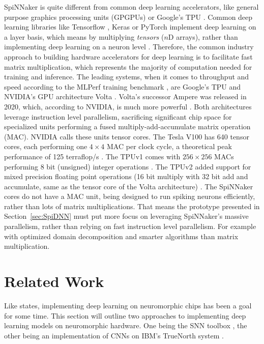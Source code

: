 \documentclass[]{article}
\begin{document}
SpiNNaker is quite different from common deep learning accelerators,
like general purpose graphics processing units (GPGPUs) or Google's
TPU \citep{jouppi_et_al_2017}.
Common deep learning libraries like Tensorflow
\citep{abadi_et_al_2015}, Keras \citep{keras} or PyTorch
\citep{paszke_et_al_2019} implement
deep learning on a layer basis, which means by multiplying
\textit{tensors} ($n$D arrays), rather than implementing deep learning
on a neuron level \citep{goodfellow_et_al_2016}.
Therefore, the common industry approach to building hardware
accelerators for deep learning is to facilitate fast matrix
multiplication, which represents the majority of computation needed
for training and inference.
The leading systems, when it comes to throughput and speed according
to the MLPerf training benchmark \citep{mlperf_2019}, are Google's
TPU \citep{jouppi_et_al_2017} and NVIDIA's GPU architecture
Volta \citep{durant_et_al_2017}.
Volta's successor Ampere was released in 2020, which, according to
NVIDIA, is much more powerful \citep{krashinsky_et_al_2020}.
Both architectures leverage instruction level parallelism, sacrificing
significant chip space for specialized units performing a
fused multiply-add-accumulate matrix operation (MAC).
NVIDIA calls these units tensor cores. The Tesla V100 has 640 tensor
cores, each performing one $4\times 4$ MAC per clock cycle, a
theoretical peak performance of 125 terraflop/s
\citep{markidis_et_al_2018}.
The TPUv1 comes with $256\times256$ MACs performing 8 bit (unsigned)
integer operations \citep{jouppi_et_al_2017}.
The TPUv2 added support for mixed precision floating point operations
(16 bit multiply with 32 bit add and accumulate, same as the
tensor core of the Volta architecture)
\citep{kennedy_2017, markidis_et_al_2018}.
The SpiNNaker cores do not have a MAC unit, being designed to run
spiking neurons efficiently, rather than lots of matrix
multiplications.
That means the prototype presented in Section~\ref{sec:SpiDNN} must
put more focus on leveraging SpiNNaker's massive parallelism, rather
than relying on fast instruction level parallelism.
For example with optimized domain decomposition and smarter algorithms
than matrix multiplication.




\section{Related Work} %
\label{sec:related_work}

Like \citet{gomes_2017} states, implementing deep learning on
neuromorphic chips has been a goal for some time.
This section will outline two approaches to implementing deep learning
models on neuromorphic hardware.
One being the SNN toolbox \citep{rueckauer_et_al_2017}, the other
being an implementation of CNNs on IBM's TrueNorth system
\citep{esser_et_al_2016}.
\end{document}
